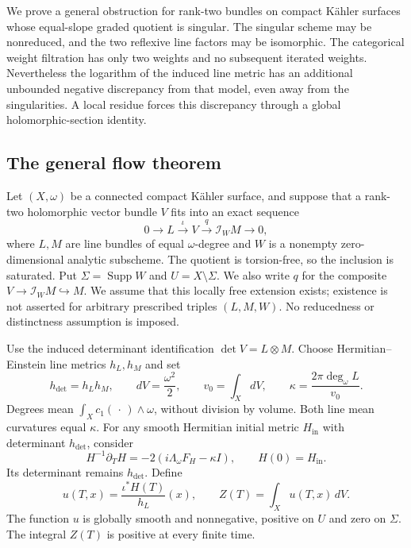 \documentclass[11pt]{amsart}
\theoremstyle{definition}
\theoremstyle{remark}
\newcommand{\cI}{\mathcal I}
\begin{document}
We prove a general obstruction for rank-two bundles on compact K\"ahler
surfaces whose equal-slope graded quotient is singular. The singular
scheme may be nonreduced, and the two reflexive line factors may be
isomorphic. The categorical weight filtration has only two weights and
no subsequent iterated weights. Nevertheless the logarithm of the induced
line metric has an additional unbounded negative discrepancy from that
model, even away from the singularities. A local residue forces this
discrepancy through a global holomorphic-section identity.

\subsection{The general flow theorem}
Let $(X,\omega)$ be a connected compact K\"ahler surface, and suppose
that a rank-two holomorphic vector bundle $V$ fits into an exact sequence
\begin{equation}\label{eq:intro-extension}
 0\longrightarrow L\xrightarrow{\iota}V\xrightarrow{q}
 \cI_WM\longrightarrow0,
\end{equation}
where $L,M$ are line bundles of equal $\omega$-degree and $W$ is a
nonempty zero-dimensional analytic subscheme. The quotient is torsion-free,
so the inclusion is saturated. Put $\Sigma=\operatorname{Supp}W$ and
$U=X\setminus\Sigma$. We also write $q$ for the composite
$V\to\cI_WM\hookrightarrow M$. We assume that this locally free
extension exists; existence is not asserted for arbitrary prescribed
triples $(L,M,W)$. No reducedness or distinctness assumption is imposed.

Use the induced determinant identification $\det V=L\otimes M$.
Choose Hermitian--Einstein line metrics $h_L,h_M$ and set
\[
 h_{\det}=h_Lh_M,\qquad dV=\frac{\omega^2}{2},\qquad
 v_0=\int_XdV,\qquad \kappa=\frac{2\pi\deg_\omega L}{v_0}.
\]
Degrees mean $\int_X c_1(\,\cdot\,)\wedge\omega$, without division
by volume. Both line mean curvatures equal $\kappa$. For any smooth
Hermitian initial metric $H_{\mathrm{in}}$ with determinant $h_{\det}$,
consider
\[
 H^{-1}\partial_T H=-2(i\Lambda_\omega F_H-\kappa I),
 \qquad H(0)=H_{\mathrm{in}}.
\]
Its determinant remains $h_{\det}$. Define
\[
 u(T,x)=\frac{\iota^*H(T)}{h_L}(x),\qquad
 Z(T)=\int_Xu(T,x)\,dV.
\]
The function $u$ is globally smooth and nonnegative, positive on $U$
and zero on $\Sigma$. The integral $Z(T)$ is positive at every finite time.
\end{document}
